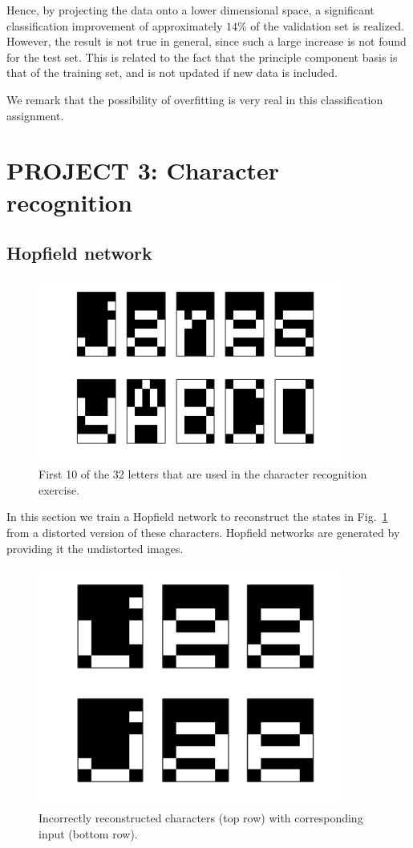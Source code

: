 \documentclass[pdftex,11pt,a4paper]{article}
\begin{document}
Hence, by projecting the data onto a lower dimensional space, a significant classification improvement of approximately $14 \%$ of the validation set is realized. However, the result is not true in general, since such a large increase is not found for the test set. This is related to the fact that the principle component basis is that of the training set, and is not updated if new data is included.

We remark that the possibility of overfitting is very real in this classification assignment. 

\newpage
\section{PROJECT 3: Character recognition}
\subsection{Hopfield network}
\begin{figure}[htb]
\centering
\includegraphics[width=10cm]{figs/letters.png}
\caption{First 10 of the 32 letters that are used in the character recognition exercise.\label{fig:letters}}
\end{figure}
In this section we train a Hopfield network to reconstruct the states in Fig.~\ref{fig:letters} from a distorted version of these characters. Hopfield networks are generated by providing it the undistorted images. 

\begin{figure}[htb]
\centering
\includegraphics[width=10cm]{figs/wrong_states.png}
\caption{Incorrectly reconstructed characters (top row) with corresponding input (bottom row).\label{fig:wrong_states}}
\end{figure}
\end{document}
